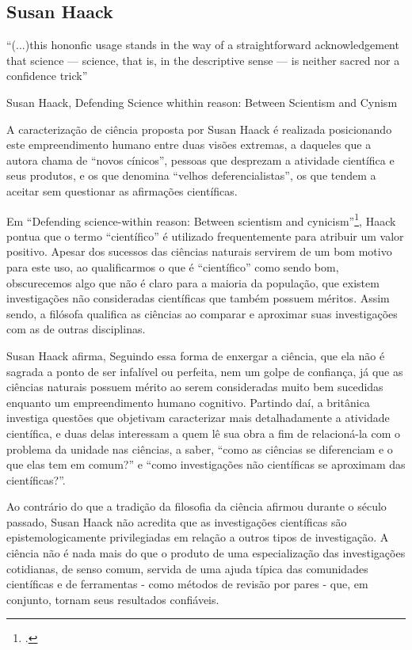 \documentclass[12pt]{report}
\begin{document}
	\subsection{Susan Haack}
	
		\epigraph{``(...)this hononfic usage
			stands in the way of a straightforward acknowledgement
			that science — science, that is, in the descriptive sense — is
			neither sacred nor a confidence trick''}{Susan Haack, Defending Science whithin reason: Between Scientism and Cynism}
	
		A caracterização de ciência proposta por Susan Haack é realizada posicionando este empreendimento humano entre duas visões extremas, a daqueles que a autora chama de ``novos cínicos'', pessoas que desprezam a atividade científica e seus produtos, e os que denomina ``velhos deferencialistas'', os que tendem a aceitar sem questionar as afirmações científicas. 
		
		Em ``Defending science-within reason: Between scientism and cynicism''\footcite{haack-defending-science}, Haack pontua que o termo ``científico'' é utilizado frequentemente para atribuir um valor positivo. Apesar dos sucessos das ciências naturais servirem de um bom motivo para este uso, ao qualificarmos o que é ``científico'' como sendo bom, obscurecemos algo que não é claro para a maioria da população, que existem investigações não consideradas científicas que também possuem méritos. Assim sendo, a filósofa qualifica as ciências ao comparar e aproximar suas investigações com as de outras disciplinas.
	
		Susan Haack afirma, Seguindo essa forma de enxergar a ciência, que ela não é sagrada a ponto de ser infalível ou perfeita, nem um golpe de confiança, já que as ciências naturais possuem mérito ao serem consideradas muito bem sucedidas enquanto um empreendimento humano cognitivo. Partindo daí, a britânica investiga questões que objetivam caracterizar mais detalhadamente a atividade científica, e duas delas interessam a quem lê sua obra a fim de relacioná-la com o problema da unidade nas ciências, a saber, ``como as ciências se diferenciam e o que elas tem em comum?'' e ``como investigações não científicas se aproximam das científicas?''.
	
		Ao contrário do que a tradição da filosofia da ciência afirmou durante o século passado, Susan Haack não acredita que as investigações científicas são epistemologicamente privilegiadas em relação a outros tipos de investigação. A ciência não é nada mais do que o produto de uma especialização das investigações cotidianas, de senso comum, servida de uma ajuda típica das comunidades científicas e de ferramentas - como métodos de revisão por pares - que, em conjunto, tornam seus resultados confiáveis.
		
\end{document}
